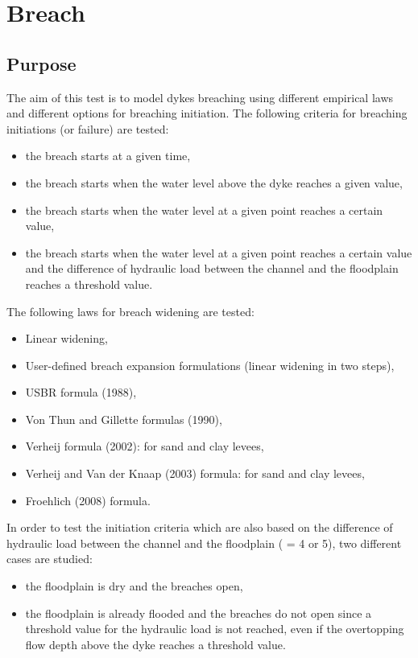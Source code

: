 \chapter{Breach}
%


\section{Purpose}
The aim of this test is to model dykes breaching using different empirical laws
and different options for breaching initiation.
The following criteria for breaching initiations (or failure) are tested:
\begin{itemize}
 \item the breach starts at a given time,
 \item the breach starts when the water level above the dyke reaches a given
       value,
 \item the breach starts when the water level at a given point reaches a
       certain value,
 \item the breach starts when the water level at a given point reaches a
       certain value and the difference of hydraulic load between the channel
       and the floodplain reaches a threshold value.
\end{itemize}
The following laws for breach widening are tested:
\begin{itemize}
\item Linear widening,
\item User-defined breach expansion formulations (linear widening in two steps),
\item USBR formula (1988),
\item Von Thun and Gillette formulas (1990),
\item Verheij formula (2002): for sand and clay levees,
\item Verheij and Van der Knaap (2003) formula: for sand and clay levees,
\item Froehlich (2008) formula.
\end{itemize}
In order to test the initiation criteria which are also based on the difference
of hydraulic load between the channel and the floodplain
( = 4 or 5), two different cases are studied:
\begin{itemize}
 \item the floodplain is dry and the breaches open,
 \item the floodplain is already flooded and the breaches do not open since a
       threshold value for the hydraulic load is not reached, even if the
       overtopping flow depth above the dyke reaches a threshold value.
\end{itemize}
